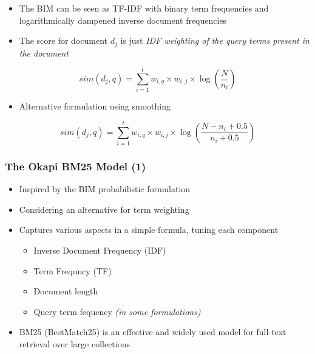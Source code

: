 \documentclass[svgnames]{beamer}
\begin{document}
\begin{frame}[allowframebreaks]
  \begin{block}{}
    \begin{itemize}
    \item The BIM can be seen as TF-IDF with binary term frequencies and logarithmically dampened inverse document frequencies
    \item The score for document $d_j$ is just \emph{IDF weighting of the query terms present in the document}
    \end{itemize}
	\begin{displaymath}  
	sim(d_j,q) = \sum_{i=1}^t w_{i,q} \times w_{i,j} \times \log \left( \frac{N}{n_i} \right)
	\end{displaymath}
    \begin{itemize}
    \item Alternative formulation using smoothing
    \end{itemize}
	\begin{displaymath}  
	sim(d_j,q) = \sum_{i=1}^t w_{i,q} \times w_{i,j} \times \log \left( \frac{N - n_i + 0.5}{n_i + 0.5} \right)
	\end{displaymath}
   \end{block}
\end{frame}

\begin{frame} \frametitle{The Okapi BM25 Model (1)}
\begin{itemize}
\item Inspired by the BIM probabilistic formulation
\item Considering an alternative for term weighting
\item Captures various aspects in a simple formula, tuning each component
    \begin{itemize}
    \item Inverse Document Frequency (IDF)
    \item Term Frequncy (TF)
    \item Document length 
    \item Query term fequency {\it (in some formulations)}
    \end{itemize}
\item BM25 (BestMatch25) is an effective and widely used model for full-text retrieval over large collections
\end{itemize}
\end{frame}
\end{document}
